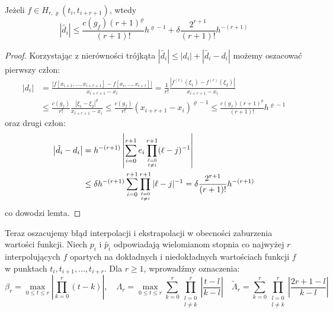 \documentclass[oik, pdftex, robocza, man]{mgrwms}
\begin{document}
    \begin{lemma}
        Jeżeli $f \in H_{r, \varrho}(t_{i}, t_{i+r+1})$, wtedy
        \begin{equation*}
            |\tilde{d_{i}}| \leq \frac{c(g_{f})(r+1)^{\varrho}}{(r+1)!} h^{\varrho-1} + \delta \frac{2^{r+1}}{(r+1)!} h^{-(r+1)}
        \end{equation*}
    \end{lemma}
    \begin{proof}
        Korzystając z nierówności trójkąta $|\tilde{d_{i}}|  \leq |d_{i}| + |\tilde{d_{i}} - d_{i}|$ możemy oszacować pierwszy człon:
        \begin{equation}
            \begin{aligned}
            \left|d_{i}\right| &=\frac{\left|f\left[x_{i+1}, \ldots, x_{i+r+1}\right]-f\left[x_{i}, \ldots, x_{i+r}\right]\right|}{x_{i+r+1}-x_{i}} 
                = \frac{1}{r !} \frac{\left|f^{(r)}\left(\xi_{1}\right)-f^{(r)}\left(\xi_{2}\right)\right|}{x_{i+r+1}-x_{i}} \\
            & \leq \frac{c\left(g_{f}\right)}{r !} \frac{\left|\xi_{1}-\xi_{2}\right|^{\varrho}}{x_{i+r+1}-x_{i}} 
                \leq \frac{c\left(g_{f}\right)}{r !}\left(x_{i+r+1}-x_{i}\right)^{\varrho-1} 
                \leq \frac{c\left(g_{f}\right)(r+1)^{\varrho}}{(r+1) !} h^{\varrho-1}
            \end{aligned}
        \end{equation}
        oraz drugi człon:
        \begin{equation}
            \begin{aligned}
            \left|\tilde{d}_{i}-d_{i}\right| & =h^{-(r+1)}\left|\sum_{i=0}^{r+1} e_{i} \prod_{\ell=0 \atop \ell \neq i}^{r+1}(\ell-j)^{-1}\right| \\
            & \leq \delta h^{-(r+1)} \sum_{i=0}^{r+1} \prod_{\ell=0 \atop \ell \neq i}^{r+1}|\ell-j|^{-1}=\delta \frac{2^{r+1}}{(r+1) !} h^{-(r+1)}
            \end{aligned}
        \end{equation}
        co dowodzi lemta.
    \end{proof}

    Teraz oszacujemy błąd interpolacji i ekstrapolacji w obecności zaburzenia wartości funkcji. Niech $p_{i}$ i $\tilde{p_{i}}$ odpowiadają wielomianom stopnia co najwyżej $r$ interpolujących $f$ opartych na dokładnych i niedokładnych wartościach funkcji $f$ w punktach $t_{i}, t_{i+1}, \dots, t_{i+r}$. Dla $r \geq 1$, wprowadźmy oznaczenia:
    \begin{equation*}
        \beta_{r} = \max_{0 \leq t \leq r} \left|\prod_{k=0}^{r} (t-k)\right|, \quad
        \Lambda_{r} = \max_{0 \leq t \leq r} \sum_{k=0}^{r} \prod_{\substack{l=0 \\ l \neq k}}^{r} \left| \frac{t-l}{k-l} \right| \quad
        \tilde{\Lambda}_{r} = \sum_{k=0}^{r} \prod_{\substack{l=0 \\ l \neq k}}^{r} \left| \frac{2r+1-l}{k-l} \right|
    \end{equation*}
\end{document}
